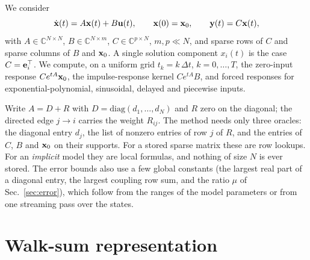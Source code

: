 \documentclass[aps,pra,superscriptaddress,floatfix,longbibliography,twocolumn]{revtex4-2}
\newcommand{\bx}{{\bf x}}
\newcommand{\bu}{{\bf u}}
\newcommand{\by}{{\bf y}}
\newcommand{\be}{{\bf e}}
\begin{document}
We consider
\begin{equation}\label{eq:lti}
\dot\bx(t)=A\bx(t)+B\bu(t),\qquad \bx(0)=\bx_0,\qquad \by(t)=C\bx(t),
\end{equation}
with $A\in\mathbb{C}^{N\times N}$, $B\in\mathbb{C}^{N\times m}$, $C\in\mathbb{C}^{p\times N}$, $m,p\ll N$, and sparse rows of $C$ and sparse columns of $B$ and $\bx_0$. A single solution component $x_i(t)$ is the case $C=\be_i^\top$. We compute, on a uniform grid $t_k=k\,\Delta t$, $k=0,\dots,T$, the zero-input response $Ce^{tA}\bx_0$, the impulse-response kernel $Ce^{tA}B$, and forced responses for exponential-polynomial, sinusoidal, delayed and piecewise inputs.

Write $A=D+R$ with $D=\mathrm{diag}(d_1,\dots,d_N)$ and $R$ zero on the diagonal; the directed edge $j\to i$ carries the weight $R_{ij}$. The method needs only three oracles: the diagonal entry $d_j$, the list of nonzero entries of row $j$ of $R$, and the entries of $C$, $B$ and $\bx_0$ on their supports. For a stored sparse matrix these are row lookups. For an \emph{implicit} model they are local formulas, and nothing of size $N$ is ever stored. The error bounds also use a few global constants (the largest real part of a diagonal entry, the largest coupling row sum, and the ratio $\mu$ of Sec.~\ref{sec:error}), which follow from the ranges of the model parameters or from one streaming pass over the states.

\section{Walk-sum representation}\label{sec:representation}
\end{document}
